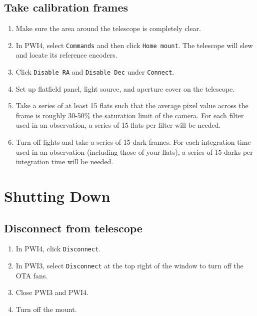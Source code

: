 \documentclass{article}
\begin{document}
	\subsection{Take calibration frames}
		
		\begin{enumerate}
			
			\item Make sure the area around the telescope is completely clear.
			
			\item In PWI4, select \texttt{Commands} and then click \texttt{Home mount}. The telescope will slew and locate its reference encoders.
			
			\item Click \texttt{Disable RA} and \texttt{Disable Dec} under \texttt{Connect}.
			
			\item Set up flatfield panel, light source, and aperture cover on the telescope.
			
			\item Take a series of at least 15 flats such that the average pixel value across the frame is roughly 30-50\% the saturation limit of the camera. For each filter used in an observation, a series of 15 flats per filter will be needed.
			
			\item Turn off lights and take a series of 15 dark frames. For each integration time used in an observation (including those of your flats), a series of 15 darks per integration time will be needed.
			
		\end{enumerate}
			
	\newpage
	\section{Shutting Down}
	
	\subsection{Disconnect from telescope}
		
		\begin{enumerate}
					
			\item In PWI4, click \texttt{Disconnect}.
			
			\item In PWI3, select \texttt{Disconnect} at the top right of the window to turn off the OTA fans.
			
			\item Close PWI3 and PWI4.
			
			\item Turn off the mount.
			
		\end{enumerate}
		
\end{document}
